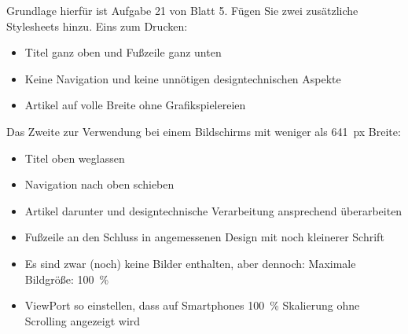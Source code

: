%
\par Grundlage hierfür ist Aufgabe 21 von Blatt 5. Fügen Sie zwei zusätzliche
Stylesheets hinzu. Eins zum Drucken:
%
\begin{itemize}
\item
Titel ganz oben und Fußzeile ganz unten
\item
Keine Navigation und keine unnötigen designtechnischen Aspekte
\item
Artikel auf volle Breite ohne Grafikspielereien
\end{itemize}
%
\par Das Zweite zur Verwendung bei einem Bildschirms mit weniger als
\qty{641}{px} Breite:
%
\begin{itemize}
\item 
Titel oben weglassen
\item 
Navigation nach oben schieben
\item 
Artikel darunter und designtechnische Verarbeitung ansprechend überarbeiten
\item 
Fußzeile an den Schluss in angemessenen Design mit noch kleinerer Schrift
\item 
Es sind zwar (noch) keine Bilder enthalten, aber dennoch: Maximale Bildgröße:
\qty{100}{\%}
\item 
ViewPort so einstellen, dass auf Smartphones \qty{100}{\%} Skalierung ohne
Scrolling angezeigt wird
\end{itemize}